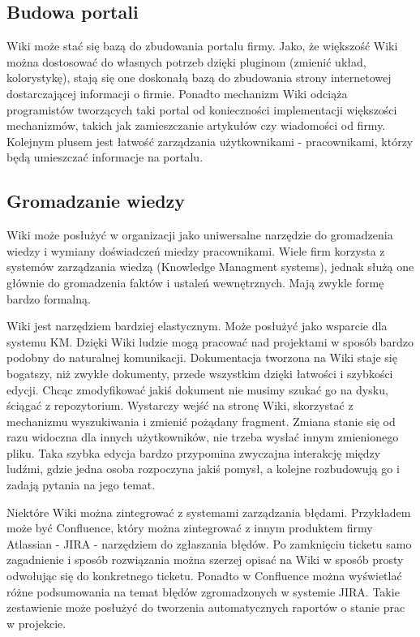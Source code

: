 \documentclass{article}
\begin{document}
	\subsection{Budowa portali}  

Wiki może stać się bazą do zbudowania portalu firmy. Jako, że większość Wiki można dostosować do własnych potrzeb dzięki pluginom (zmienić układ, kolorystykę), stają się one doskonałą bazą do zbudowania strony internetowej dostarczającej informacji o firmie. 
Ponadto mechanizm Wiki odciąża programistów tworzących taki portal od konieczności implementacji większości mechanizmów, takich jak zamieszczanie artykułów czy wiadomości od firmy.
Kolejnym plusem jest łatwość zarządzania użytkownikami - pracownikami, którzy będą umieszczać informacje na portalu.


	\subsection{Gromadzanie wiedzy}

		Wiki może posłużyć w organizacji jako uniwersalne narzędzie do gromadzenia wiedzy i wymiany doświadczeń miedzy pracownikami. Wiele firm korzysta z systemów zarządzania wiedzą (Knowledge Managment systems), jednak służą one głównie do gromadzenia faktów i ustaleń wewnętrznych. Mają zwykle formę bardzo formalną.

	Wiki jest narzędziem bardziej elastycznym. Może posłużyć jako wsparcie dla systemu KM. Dzięki Wiki ludzie mogą pracować nad projektami w sposób bardzo podobny do naturalnej komunikacji. Dokumentacja tworzona na Wiki staje się bogatszy, niż zwykłe dokumenty, przede wszystkim dzięki łatwości i szybkości edycji. Chcąc zmodyfikować jakiś dokument nie musimy szukać go na dysku, ściągać z repozytorium. Wystarczy wejść na stronę Wiki, skorzystać z mechanizmu wyszukiwania i zmienić pożądany fragment. Zmiana stanie się od razu widoczna dla innych użytkowników, nie trzeba wysłać innym zmienionego pliku. Taka szybka edycja bardzo przypomina zwyczajna interakcję między ludźmi, gdzie jedna osoba rozpoczyna jakiś pomysł, a kolejne rozbudowują go i zadają pytania na jego temat.

	Niektóre Wiki można zintegrować z systemami zarządzania błędami. Przykładem może być Confluence, który można zintegrować z innym produktem firmy Atlassian - JIRA - narzędziem do zgłaszania błędów. Po zamknięciu ticketu samo zagadnienie i sposób rozwiązania można szerzej opisać na Wiki w sposób prosty odwołując się do konkretnego ticketu. Ponadto w Confluence można wyświetlać różne podsumowania na temat błędów zgromadzonych w systemie JIRA. Takie zestawienie może posłużyć do tworzenia automatycznych raportów o stanie prac w projekcie.
\end{document}
